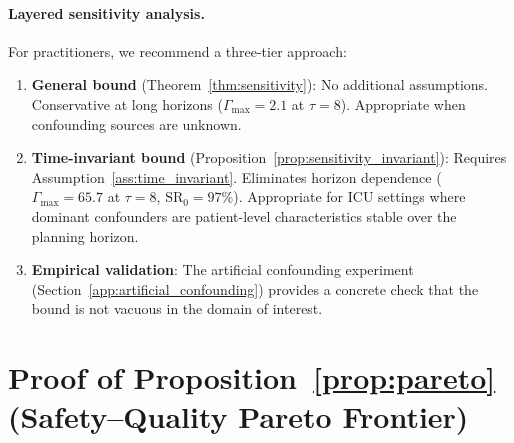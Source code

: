 \documentclass{article}
\begin{document}
\paragraph{Layered sensitivity analysis.} For practitioners, we recommend a three-tier approach:
\begin{enumerate}[leftmargin=*,topsep=2pt,itemsep=1pt]
\item \textbf{General bound} (Theorem~\ref{thm:sensitivity}): No additional assumptions. Conservative at long horizons ($\Gamma_{\max} = 2.1$ at $\tau = 8$). Appropriate when confounding sources are unknown.
\item \textbf{Time-invariant bound} (Proposition~\ref{prop:sensitivity_invariant}): Requires Assumption~\ref{ass:time_invariant}. Eliminates horizon dependence ($\Gamma_{\max} = 65.7$ at $\tau = 8$, $\mathrm{SR}_0 = 97\%$). Appropriate for ICU settings where dominant confounders are patient-level characteristics stable over the planning horizon.
\item \textbf{Empirical validation}: The artificial confounding experiment (Section~\ref{app:artificial_confounding}) provides a concrete check that the bound is not vacuous in the domain of interest.
\end{enumerate}


\section{Proof of Proposition~\ref{prop:pareto} (Safety--Quality Pareto Frontier)}
\label{app:pareto_proof}
\end{document}
